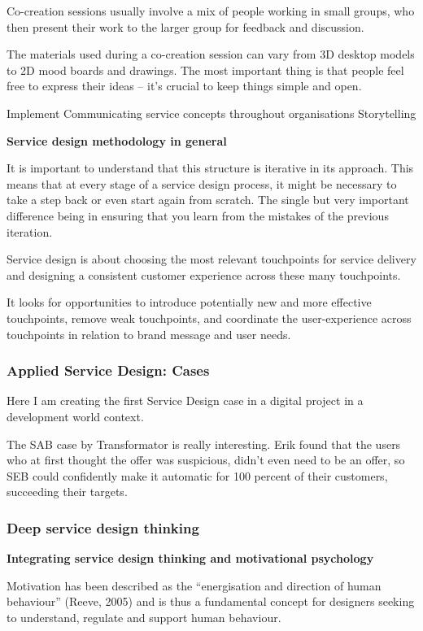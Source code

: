 Co-creation sessions usually involve a mix of people working in small groups, who then present their work to the larger group for feedback and discussion.

The materials used during a co-creation session can vary from 3D desktop models to 2D mood boards and drawings. The most important thing is that people feel free to express their ideas – it’s crucial to keep things simple and open.

Implement Communicating service concepts throughout organisations
Storytelling

\textbf{Service design methodology in general}

It is important to understand that this structure is iterative in its approach. This means that at every stage of a service design process, it might be necessary to take a step back or even start again from scratch. The single but very important difference being in ensuring that you learn from the mistakes of the previous iteration.

Service design is about choosing the most relevant touchpoints for service delivery and designing a consistent customer experience across these many touchpoints.

It looks for opportunities to introduce potentially new and more effective touchpoints, remove weak touchpoints, and coordinate the user-experience across touchpoints in relation to brand message and user needs.

\subsubsection{Applied Service Design: Cases}

Here I am creating the first Service Design case in a digital project in a development world context.

The SAB case by Transformator is really interesting. Erik found that the users who at first thought the offer was suspicious, didn't even need to be an offer, so SEB could confidently make it automatic for 100 percent of their customers, succeeding their targets.

\subsubsection{Deep service design thinking}

\textbf{Integrating service design thinking and motivational psychology}

Motivation has been described as the “energisation and direction of human behaviour” (Reeve, 2005) and is thus a fundamental concept for designers seeking to understand, regulate and support human behaviour.

